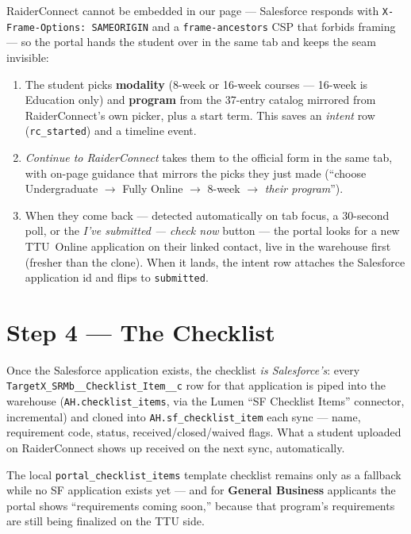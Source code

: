 \documentclass[11pt,letterpaper]{report}
\begin{document}
RaiderConnect cannot be embedded in our page --- Salesforce responds with
\texttt{X-Frame-Options: SAMEORIGIN} and a \texttt{frame-ancestors} CSP that
forbids framing --- so the portal hands the student over in the same tab and
keeps the seam invisible:

\begin{enumerate}[leftmargin=1.6em]
  \item The student picks \textbf{modality} (8-week or 16-week courses ---
        16-week is Education only) and \textbf{program} from the 37-entry
        catalog mirrored from RaiderConnect's own picker, plus a start term.
        This saves an \emph{intent} row (\texttt{rc\_started}) and a timeline
        event.
  \item \emph{Continue to RaiderConnect} takes them to the official form in the
        same tab, with on-page guidance that mirrors the picks they just made
        (``choose Undergraduate $\rightarrow$ Fully Online $\rightarrow$
        8-week $\rightarrow$ \emph{their program}'').
  \item When they come back --- detected automatically on tab focus, a 30-second
        poll, or the \emph{I've submitted --- check now} button --- the portal
        looks for a new TTU~Online application on their linked contact, live in
        the warehouse first (fresher than the clone). When it lands, the intent
        row attaches the Salesforce application id and flips to
        \texttt{submitted}.
\end{enumerate}

\section{Step 4 --- The Checklist}

Once the Salesforce application exists, the checklist \emph{is Salesforce's}:
every \texttt{TargetX\_SRMb\_\_Checklist\_Item\_\_c} row for that application is
piped into the warehouse (\texttt{AH.checklist\_items}, via the Lumen ``SF
Checklist Items'' connector, incremental) and cloned into
\texttt{AH.sf\_checklist\_item} each sync --- name, requirement code, status,
received/closed/waived flags. What a student uploaded on RaiderConnect shows up
received on the next sync, automatically.

The local \texttt{portal\_checklist\_items} template checklist remains only as a
fallback while no SF application exists yet --- and for \textbf{General
Business} applicants the portal shows ``requirements coming soon,'' because
that program's requirements are still being finalized on the TTU side.
\end{document}
